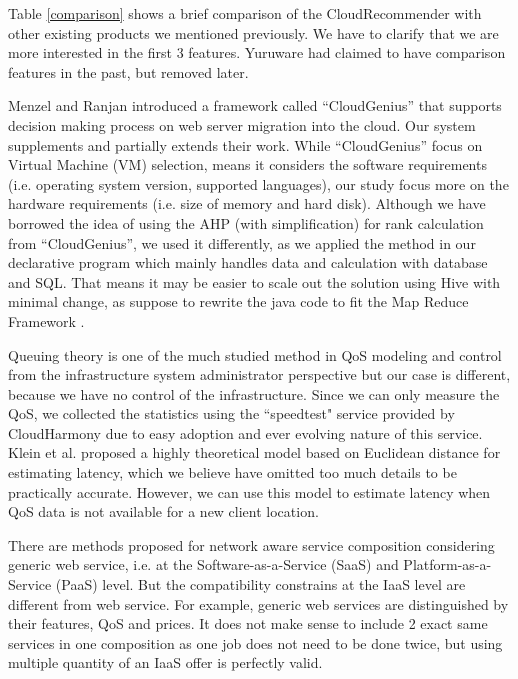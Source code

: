 \documentclass[journal]{IEEEtran}
\begin{document}
Table \ref{comparison} shows a brief comparison of the CloudRecommender with other existing products we mentioned previously. We have to clarify that we are more interested in the first 3 features. Yuruware had claimed to have comparison features in the past, but removed later.

Menzel and Ranjan    \cite{menzel2012cloudgenius} introduced a framework called ``CloudGenius'' that supports decision making process on web server migration into the cloud. Our system supplements and partially extends their work. While ``CloudGenius'' focus on Virtual Machine (VM) selection, means it considers the software requirements (i.e. operating system version, supported languages), our study focus more on the hardware requirements (i.e. size of memory and hard disk).  Although we have borrowed the idea of using the AHP (with simplification) for rank calculation from ``CloudGenius'', we used it differently, as we applied the method in our declarative program which mainly handles data and calculation with database and SQL. That means it may be easier to scale out the solution using Hive \cite{ref29} with minimal change, as suppose to rewrite the java code to fit the Map Reduce Framework    \cite{dean2008mapreduce}.


Queuing theory is one of the much studied method in QoS modeling and control from the infrastructure system administrator perspective    \cite{sha2002queueing} but our case is different, because we have no control of the infrastructure. Since we can only measure the QoS, we collected the statistics using the ``speedtest"  service provided by CloudHarmony due to easy adoption and ever evolving nature of this service. Klein et al.    \cite{klein2012towards} proposed a highly theoretical model based on Euclidean distance for estimating latency, which we believe have omitted too much details to be practically accurate. However, we can use this model to estimate latency when QoS data is not available for a new client location.


There are methods proposed for network aware service composition    \cite{yu2007efficient}   \cite{zeng2004qos}    \cite{zheng2013qos} considering generic web service, i.e. at the Software-as-a-Service (SaaS) and Platform-as-a-Service (PaaS) level. But the compatibility constrains at the IaaS level are different from web service. For example, generic web services are distinguished by their features, QoS and prices. It does not make sense to include 2 exact same services in one composition as one job does not need to be done twice, but using multiple quantity of an IaaS offer is perfectly valid.
\end{document}
